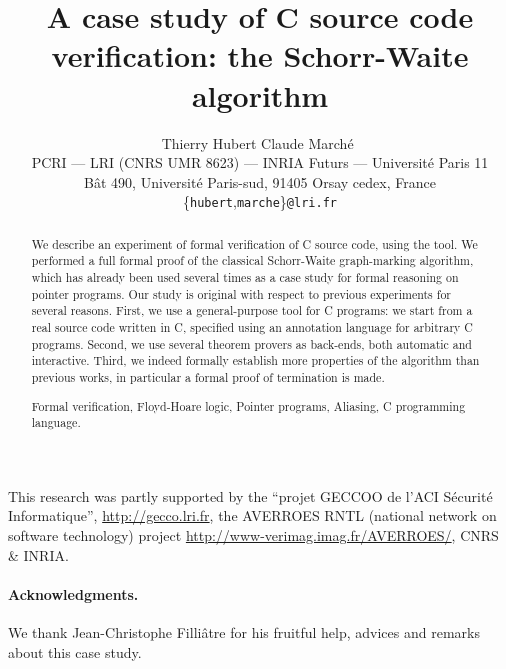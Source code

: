 \documentclass{ieee}
\begin{document}
\sloppy

\title{A case study of C source code verification: the Schorr-Waite algorithm}
\author{~\hfill Thierry Hubert \hfill\hfill Claude March\'e \hfill~\\
PCRI --- LRI (CNRS UMR 8623) --- INRIA Futurs ---
  Universit\'e Paris 11 \\
B\^at 490, Universit\'e Paris-sud, 91405 Orsay cedex, France \\
\{\texttt{hubert},\texttt{marche}\}\texttt{@lri.fr} 
}
\maketitle

\begin{abstract}
  We describe an experiment of formal verification of C source code,
  using the \caduceus{} tool. We performed a full formal proof of the
  classical Schorr-Waite graph-marking algorithm, which has already
  been used several times as a case study for formal reasoning on
  pointer programs. Our study is original with respect to previous
  experiments for several reasons. First, we use a general-purpose
  tool for C programs: we start from a real source code written in
  C, specified using an annotation language for arbitrary C programs.
  Second, we use several theorem provers as back-ends, both automatic
  and interactive.  Third, we indeed formally establish more
  properties of the algorithm than previous works, in particular a
  formal proof of termination is made.

   Formal verification, Floyd-Hoare logic,
  Pointer programs, Aliasing, C programming language.
\end{abstract}

This research was partly supported by the ``projet
  GECCOO de l'ACI S\'ecurit\'e Informatique'',
  \url{http://gecco.lri.fr}, the AVERROES RNTL (national network on
  software technology) project
  \url{http://www-verimag.imag.fr/AVERROES/}, CNRS \& INRIA.

\bigskip







\bigskip
\paragraph{Acknowledgments.} 
We thank Jean-Christophe Filli\^atre for his fruitful help, advices and
remarks about this case study.



\end{document}
